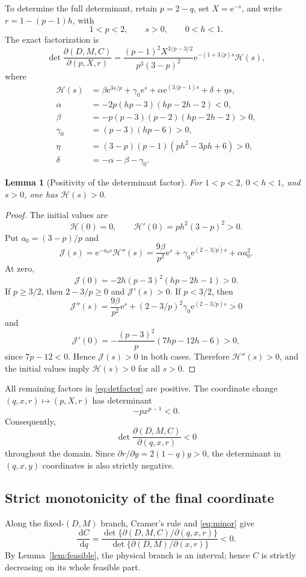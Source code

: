 \documentclass[11pt]{article}
\newtheorem{lemma}[theorem]{Lemma}
\newcommand{\e}{\mathrm e}
\newcommand{\dd}{\,\mathrm d}
\begin{document}
To determine the full determinant, retain $p=2-q$, set $X=\e^{-s}$, and write $r=1-(p-1)h$, with
\[
1<p<2,\qquad s>0,\qquad 0<h<1.
\]
The exact factorization is
\begin{equation}\label{eq:detfactor}
\det\frac{\partial(D,M,C)}{\partial(p,X,r)}
=\frac{(p-1)^2X^{3/p-3/2}}{p^3(3-p)^2}
\e^{-(1+3/p)s}\mathcal H(s),
\end{equation}
where
\begin{align*}
\mathcal H(s)&=\beta\e^{3s/p}+\gamma_0\e^s
+\alpha\e^{(3/p-1)s}+\delta+\eta s,\\
\alpha&=-2p(hp-3)(hp-2h-2)<0,\\
\beta&=-p(p-3)(p-2)(hp-2h-2)>0,\\
\gamma_0&=(p-3)(hp-6)>0,\\
\eta&=(3-p)(p-1)(ph^2-3ph+6)>0,\\
\delta&=-\alpha-\beta-\gamma_0.
\end{align*}

\begin{lemma}[Positivity of the determinant factor]\label{lem:Hpositive}
For $1<p<2$, $0<h<1$, and $s>0$, one has $\mathcal H(s)>0$.
\end{lemma}
\begin{proof}
The initial values are
\[
\mathcal H(0)=0,
\qquad
\mathcal H'(0)=ph^2(3-p)^2>0.
\]
Put $a_0=(3-p)/p$ and
\[
\mathcal J(s)=\e^{-a_0s}\mathcal H''(s)
=\frac{9\beta}{p^2}\e^s
+\gamma_0\e^{(2-3/p)s}+\alpha a_0^2.
\]
At zero,
\[
\mathcal J(0)=-2h(p-3)^2(hp-2h-1)>0.
\]
If $p\ge3/2$, then $2-3/p\ge0$ and $\mathcal J'(s)>0$.  If $p<3/2$, then
\[
\mathcal J''(s)=\frac{9\beta}{p^2}\e^s
+(2-3/p)^2\gamma_0\e^{(2-3/p)s}>0
\]
and
\[
\mathcal J'(0)=-\frac{(p-3)^2}{p}(7hp-12h-6)>0,
\]
since $7p-12<0$.  Hence $\mathcal J(s)>0$ in both cases.  Therefore $\mathcal H''(s)>0$, and the initial values imply $\mathcal H(s)>0$ for all $s>0$.
\end{proof}

All remaining factors in \eqref{eq:detfactor} are positive.  The coordinate change $(q,x,r)\mapsto(p,X,r)$ has determinant
\[
-px^{p-1}<0.
\]
Consequently,
\begin{equation}\label{eq:jacnegative}
\det\frac{\partial(D,M,C)}{\partial(q,x,r)}<0
\end{equation}
throughout the domain.  Since $\partial r/\partial y=2(1-q)y>0$, the determinant in $(q,x,y)$ coordinates is also strictly negative.

\subsection{Strict monotonicity of the final coordinate}
Along the fixed-$(D,M)$ branch, Cramer's rule and \eqref{eq:minor} give
\begin{equation}\label{eq:Cmonotone}
\frac{\dd C}{\dd q}
=\frac{\det\{\partial(D,M,C)/\partial(q,x,r)\}}
       {\det\{\partial(D,M)/\partial(x,r)\}}<0.
\end{equation}
By Lemma~\ref{lem:feasible}, the physical branch is an interval; hence $C$ is strictly decreasing on its whole feasible part.
\end{document}
